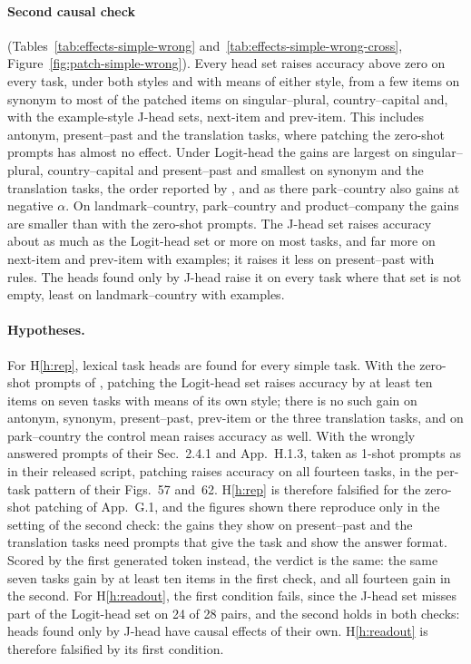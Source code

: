 \documentclass[11pt,a4paper]{article}
\begin{document}
\paragraph{Second causal check} (Tables~\ref{tab:effects-simple-wrong} and~\ref{tab:effects-simple-wrong-cross}, Figure~\ref{fig:patch-simple-wrong}). Every head set raises accuracy above zero on every task, under both styles and with means of either style, from a few items on synonym to most of the patched items on singular--plural, country--capital and, with the example-style J-head sets, next-item and prev-item. This includes antonym, present--past and the translation tasks, where patching the zero-shot prompts has almost no effect. Under Logit-head the gains are largest on singular--plural, country--capital and present--past and smallest on synonym and the translation tasks, the order reported by \citet[Figs.~57 and~62]{yang2026shared}, and as there park--country also gains at negative $\alpha$. On landmark--country, park--country and product--company the gains are smaller than with the zero-shot prompts. The J-head set raises accuracy about as much as the Logit-head set or more on most tasks, and far more on next-item and prev-item with examples; it raises it less on present--past with rules. The heads found only by J-head raise it on every task where that set is not empty, least on landmark--country with examples.

\paragraph{Hypotheses.} For H\ref{h:rep}, lexical task heads are found for every simple task. With the zero-shot prompts of \citet[App.~G.1]{yang2026shared}, patching the Logit-head set raises accuracy by at least ten items on seven tasks with means of its own style; there is no such gain on antonym, synonym, present--past, prev-item or the three translation tasks, and on park--country the control mean raises accuracy as well. With the wrongly answered prompts of their Sec.~2.4.1 and App.~H.1.3, taken as 1-shot prompts as in their released script, patching raises accuracy on all fourteen tasks, in the per-task pattern of their Figs.~57 and~62. H\ref{h:rep} is therefore falsified for the zero-shot patching of App.~G.1, and the figures shown there reproduce only in the setting of the second check: the gains they show on present--past and the translation tasks need prompts that give the task and show the answer format. Scored by the first generated token instead, the verdict is the same: the same seven tasks gain by at least ten items in the first check, and all fourteen gain in the second. For H\ref{h:readout}, the first condition fails, since the J-head set misses part of the Logit-head set on 24 of 28 pairs, and the second holds in both checks: heads found only by J-head have causal effects of their own. H\ref{h:readout} is therefore falsified by its first condition.
\end{document}
